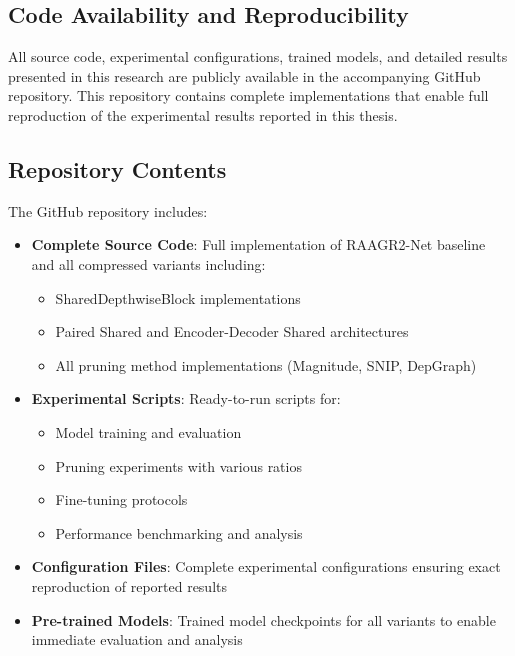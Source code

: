 \documentclass[12pt,a4paper]{article}
\begin{document}
\begin{enumerate}
\section{Code Availability and Reproducibility}
\label{appendix:code}

All source code, experimental configurations, trained models, and detailed results presented in this research are publicly available in the accompanying GitHub repository. This repository contains complete implementations that enable full reproduction of the experimental results reported in this thesis.

\subsection{Repository Contents}

The GitHub repository includes:

\begin{itemize}
    \item \textbf{Complete Source Code}: Full implementation of RAAGR2-Net baseline and all compressed variants including:
    \begin{itemize}
        \item SharedDepthwiseBlock implementations
        \item Paired Shared and Encoder-Decoder Shared architectures
        \item All pruning method implementations (Magnitude, SNIP, DepGraph)
    \end{itemize}
    
    \item \textbf{Experimental Scripts}: Ready-to-run scripts for:
    \begin{itemize}
        \item Model training and evaluation
        \item Pruning experiments with various ratios
        \item Fine-tuning protocols
        \item Performance benchmarking and analysis
    \end{itemize}
    
    \item \textbf{Configuration Files}: Complete experimental configurations ensuring exact reproduction of reported results
    
    \item \textbf{Pre-trained Models}: Trained model checkpoints for all variants to enable immediate evaluation and analysis
    

\end{itemize}
\end{enumerate}
\end{document}
